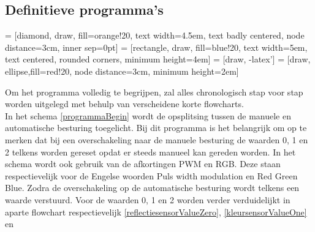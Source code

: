 \documentclass[a4paper,twoside,kulak]{kulakreport} %
\begin{document}
\subsection{Definitieve programma's}

 = [diamond, draw, fill=orange!20, text width=4.5em, text badly centered, node distance=3cm, inner sep=0pt]
 = [rectangle, draw, fill=blue!20, text width=5em, text centered, rounded corners, minimum height=4em]
 = [draw, -latex']
 = [draw, ellipse,fill=red!20, node distance=3cm,
minimum height=2em]


Om het programma volledig te begrijpen, zal alles chronologisch stap voor stap worden uitgelegd met behulp van verscheidene korte flowcharts. \\

In het schema \ref{programmaBegin} wordt de opsplitsing tussen de manuele en automatische besturing toegelicht. Bij dit programma is het belangrijk om op te merken dat bij een overschakeling naar de manuele besturing de waarden 0, 1 en 2 telkens worden gereset opdat er steeds manueel kan gereden worden. %
In het schema wordt ook gebruik van de afkortingen PWM en RGB. Deze staan respectievelijk voor de Engelse woorden Puls width modulation en Red Green Blue.
Zodra de overschakeling op de automatische besturing wordt telkens een waarde verstuurd. Voor de waarden 0, 1 en 2 worden verder verduidelijkt in aparte flowchart respectievelijk \ref{reflectiesensorValueZero}, \ref{kleursensorValueOne} en %
\end{document}
